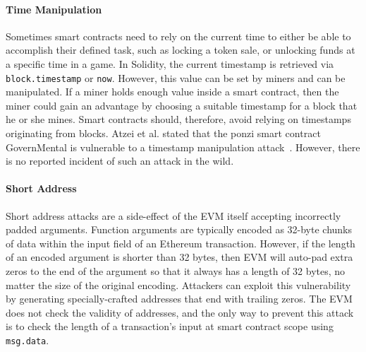         \paragraph{Time Manipulation}
            Sometimes smart contracts need to rely on the current time to either be able to accomplish their defined task, such as locking a token sale, or unlocking funds at a specific time in a game.
            In Solidity, the current timestamp is retrieved via \texttt{block.timestamp} or \texttt{now}.
            However, this value can be set by miners and can be manipulated.
            If a miner holds enough value inside a smart contract, then the miner could gain an advantage by choosing a suitable timestamp for a block that he or she mines.
            Smart contracts should, therefore, avoid relying on timestamps originating from blocks.
            Atzei et al. stated that the ponzi smart contract GovernMental is vulnerable to a timestamp manipulation attack~\cite{atzei2017survey}.
            However, there is no reported incident of such an attack in the wild.
        
        \paragraph{Short Address}
            Short address attacks are a side-effect of the EVM itself accepting incorrectly padded arguments. 
            Function arguments are typically encoded as 32-byte chunks of data within the input field of an Ethereum transaction.
            However, if the length of an encoded argument is shorter than 32 bytes, then EVM will auto-pad extra zeros to the end of the argument so that it always has a length of 32 bytes, no matter the size of the original encoding.
            Attackers can exploit this vulnerability by generating specially-crafted addresses that end with trailing zeros.
            The EVM does not check the validity of addresses, and the only way to prevent this attack is to check the length of a transaction's input at smart contract scope using \texttt{msg.data}.
